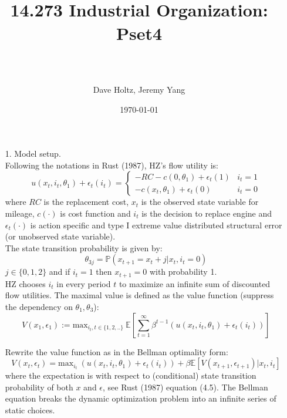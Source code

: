 \documentclass[paper=a4, fontsize=11pt]{scrartcl} %
\title{
\normalfont \normalsize

\horrule{0.5pt} \\[0.4cm] %
\huge 14.273 Industrial Organization: Pset4 \\ %
\horrule{.5pt} \\[0.4cm] %
}
\author{Dave Holtz, Jeremy Yang} %
\date{\normalsize\today} %
\numberwithin{equation}{section} %
\numberwithin{figure}{section} %
\numberwithin{table}{section} %
\begin{document}
\maketitle
\begin{itemize}
\item[1.] Model setup.\\

Following the notations in Rust (1987), HZ's flow utility is:
\[u(x_t,i_t,\theta_1)+\epsilon_t(i_t) =
\begin{cases}
-RC-c(0,\theta_1)+\epsilon_t(1) & i_t = 1\\
-c(x_t,\theta_1)+\epsilon_t(0) & i_t=0
\end{cases}\]
where $RC$ is the replacement cost, $x_t$ is the observed state variable for mileage, $c(\cdot)$ is cost function and $i_t$ is the decision to replace engine and $\epsilon_t(\cdot)$ is action specific and type I extreme value distributed structural error (or unobserved state variable).\\

The state transition probability is given by:
\[\theta_{3j} = \mathbb{P}(x_{t+1}=x_t+j|x_t,i_t=0)\]
$j \in \{0,1,2\}$ and if $i_{t}=1$ then $x_{t+1}=0$ with probability 1.\\

HZ chooses $i_t$ in every period $t$ to maximize an infinite sum of discounted flow utilities. The maximal value is defined as the value function (suppress the dependency on $\theta_1, \theta_3$):
\[V(x_1,\epsilon_1) := \text{max}_{i_t, t\in\{1,2,..\}}\ \mathbb{E}[\sum_{t=1}^\infty \beta^{t-1} (u(x_t,i_t,\theta_1)+\epsilon_t(i_t))]\]

Rewrite the value function as in the Bellman optimality form:
\[V(x_t, \epsilon_t) = \text{max}_{i_t} \ (u(x_t,i_t,\theta_1)+\epsilon_t(i_t)) + \beta \mathbb{E}[V(x_{t+1},\epsilon_{t+1})|x_t, i_t]\]
where the expectation is with respect to (conditional) state transition probability of both $x$ and $\epsilon$, see Rust (1987) equation (4.5). The Bellman equation breaks the dynamic optimization problem into an infinite series of static choices.



\end{itemize}
\end{document}
